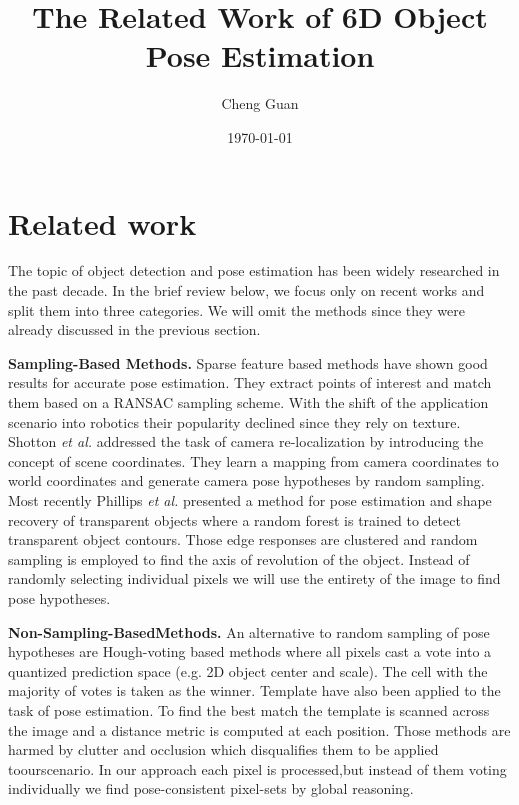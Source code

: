 \documentclass[10pt,twocolumn,a4paper]{article}
\title{The Related Work of 6D Object Pose Estimation}
\author{Cheng Guan}
\date{\today}
\begin{document}
\maketitle
\section{Related work}
  The topic of object detection and pose estimation has
been widely researched in the past decade. In the brief review below,
 we focus only on recent works and split them into three categories.
 We will omit the methods \cite{c1} since they were already discussed
 in the previous section.

 \textbf{Sampling-Based Methods.} Sparse feature based methods \cite{c2}
 have shown good results for accurate pose estimation. They extract points of
 interest and match them based on a RANSAC sampling scheme. With the shift of the
 application scenario into robotics their popularity declined since they rely on texture.
  Shotton \emph{et al.} \cite{c3} addressed the task of camera re-localization by introducing the concept of scene coordinates.
  They learn a mapping from camera coordinates to world coordinates and generate camera pose hypotheses by
   random sampling. Most recently Phillips \emph{et al.} \cite{c4} presented a method for
   pose estimation and shape recovery of transparent objects where a random forest is trained
   to detect transparent object contours. Those edge responses are clustered and random sampling
  is employed to ﬁnd the axis of revolution of the object. Instead of
   randomly selecting individual pixels we will use the entirety of the image to
   ﬁnd pose hypotheses.

   \textbf{Non-Sampling-BasedMethods.} An alternative to random sampling of pose hypotheses are
   Hough-voting based methods where all pixels cast a vote into a quantized
   prediction space (e.g. 2D object center and scale). The cell with the majority
   of votes is taken as the winner. Template  have also been applied to the task
   of pose estimation. To ﬁnd the best match the template is scanned across
   the image and a distance metric is computed at each position. Those
    methods are harmed by clutter and occlusion which disqualiﬁes them to be
     applied toourscenario. In our approach each pixel is processed,but
     instead of them voting individually we ﬁnd pose-consistent pixel-sets
     by global reasoning.
\end{document}
